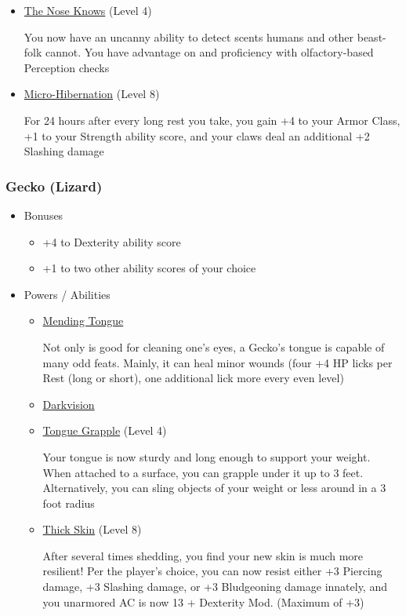 \documentclass[12pt, twoside]{article}
\begin{document}
\begin{FlushLeft}
\begin{multicols}{2}
\begin{itemize}[wide]
\begin{itemize}
					\item \underline{The Nose Knows} (Level 4)

					You now have an uncanny ability to detect scents humans and other beast-folk cannot.
					You have advantage on and proficiency with olfactory-based Perception checks
					\item \underline{Micro-Hibernation} (Level 8)

					For 24 hours after every long rest you take, you gain +4 to your Armor Class, +1 to your Strength ability score, and your claws deal an additional +2 Slashing damage
				\end{itemize}
			\end{itemize}
			\vfill \null \columnbreak

			\subsubsection{Gecko (Lizard)}
			\begin{itemize}[wide]
				\item Bonuses
				\begin{itemize}
					\item +4 to Dexterity ability score
					\item +1 to two other ability scores of your choice
				\end{itemize}
				\item Powers / Abilities
				\begin{itemize}
					\item \underline{Mending Tongue}

						Not only is good for cleaning one's eyes, a Gecko’s tongue is capable of many odd feats.
						Mainly, it can heal minor wounds (four +4 HP licks per Rest (long or short), one additional lick more every even level)
					\item \underline{Darkvision}
					\item \underline{Tongue Grapple} (Level 4)

					Your tongue is now sturdy and long enough to support your weight. When attached to a surface, you can grapple under it up to 3 feet.
					Alternatively, you can sling objects of your weight or less around in a 3 foot radius
					\item \underline{Thick Skin} (Level 8)

					After several times shedding, you find your new skin is much more resilient!
					Per the player’s choice, you can now resist either +3 Piercing damage, +3 Slashing damage, or +3 Bludgeoning damage innately, and you unarmored AC is now 13 + Dexterity Mod. (Maximum of +3)
				\end{itemize}
			\end{itemize}
			\vfill \pagebreak


\end{multicols}
\end{FlushLeft}
\end{document}
